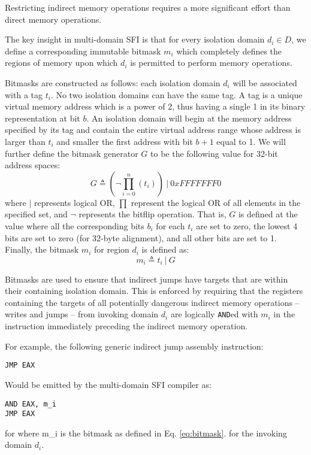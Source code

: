 \documentclass[12pt]{article}
\begin{document}
Restricting indirect memory operations requires a more significant effort than direct memory operations.

The key insight in multi-domain SFI is that for every isolation domain $d_i \in D$, we define a corresponding immutable bitmask $m_i$ which completely defines the regions of memory upon which $d_i$ is permitted to perform memory operations.

Bitmasks are constructed as follows: each isolation domain $d_i$ will be associated with a tag $t_i$. No two isolation domains can have the same tag. A tag is a unique virtual memory address which is a power of 2, thus having a single 1 in its binary representation at bit $b$.  An isolation domain will begin at the memory address specified by its tag and contain the entire virtual address range whose address is larger than $t_i$ and smaller the first address with bit $b+1$ equal to 1. We will further define the bitmask generator $G$ to be the following value for 32-bit address spaces:
\begin{equation} \label{eq:G}
G \triangleq (\neg\prod_{i=0}^n(t_i))\ |\  0xFFFFFFF0
\end{equation}
where $|$ represents logical OR, $\prod$ represent the logical OR of all elements in the specified set, and $\neg$ represents the bitflip operation. That is, $G$ is defined at the value where all the corresponding bits $b_i$ for each $t_i$ are set to zero, the lowest 4 bits are set to zero (for 32-byte alignment), and all other bits are set to 1. Finally, the bitmask $m_i$  for region $d_i$ is defined as:
\begin{equation} \label{eq:bitmask}
m_i \triangleq t_i\ |\ G
\end{equation}

Bitmasks are used to ensure that indirect jumps have targets that are within their containing isolation domain. This is enforced by requiring that the registers containing the targets of all potentially dangerous indirect memory operations -- writes and jumps -- from invoking domain $d_i$ are logically \texttt{AND}ed with $m_i$ in the instruction immediately preceding the indirect memory operation.

For example, the following generic indirect jump assembly instruction:
\begin{verbatim}
JMP EAX
\end{verbatim}
Would be emitted by the multi-domain SFI compiler as:
\begin{verbatim}
AND EAX, m_i
JMP EAX
\end{verbatim}
for where m\_i is the bitmask as defined in Eq. \ref{eq:bitmask}.  for the invoking domain $d_i$. \\
\end{document}
